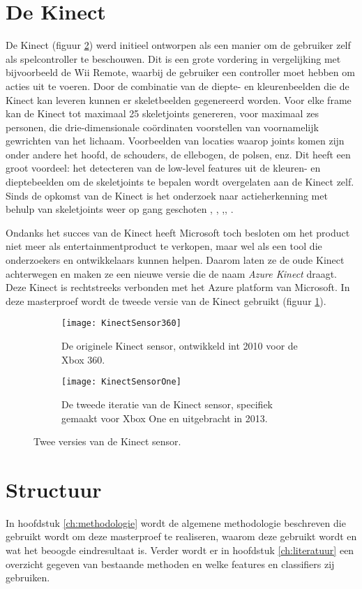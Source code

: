 \section{De Kinect}
De Kinect (figuur \ref{fig:KinectSensorVersies}) werd initieel ontworpen als een manier om de gebruiker zelf als spelcontroller te beschouwen. Dit is een grote vordering in vergelijking met bijvoorbeeld de Wii Remote, waarbij de gebruiker een controller moet hebben om acties uit te voeren. Door de combinatie van de diepte- en kleurenbeelden die de Kinect kan leveren kunnen er skeletbeelden gegenereerd worden. Voor elke frame kan de Kinect tot maximaal 25 skeletjoints genereren, voor maximaal zes personen, die drie-dimensionale coördinaten voorstellen van voornamelijk gewrichten van het lichaam. Voorbeelden van locaties waarop joints komen zijn onder andere het hoofd, de schouders, de ellebogen, de polsen, enz. Dit heeft een groot voordeel: het detecteren van de low-level features uit de kleuren- en dieptebeelden om de skeletjoints te bepalen wordt overgelaten aan de Kinect zelf. Sinds de opkomst van de Kinect is het onderzoek naar actieherkenning met behulp van skeletjoints weer op gang geschoten \cite{Deboeverie2016}, \cite{Xia2012}, \cite{Wang2014},\cite{Vemulapalli2014}, \cite{Li2018}.


Ondanks het succes van de Kinect heeft Microsoft toch besloten om het product niet meer als entertainmentproduct te verkopen, maar wel als een tool die onderzoekers en ontwikkelaars kunnen helpen. Daarom laten ze de oude Kinect achterwegen en maken ze een nieuwe versie  die de  naam \textit{Azure Kinect} draagt. Deze Kinect is rechtstreeks verbonden met het Azure platform van Microsoft. In deze masterproef wordt de tweede versie van de Kinect gebruikt (figuur \ref{fig:KinectSensorOne}).

\begin{figure}
	\begin{subfigure}[t]{0.48\textwidth}
		\texttt{[image: KinectSensor360]}
		\caption{De originele Kinect sensor, ontwikkeld int 2010 voor de Xbox 360.}
	\end{subfigure}
	\begin{subfigure}[t]{0.48\textwidth}
		\texttt{[image: KinectSensorOne]}
		\caption{De tweede iteratie van de Kinect sensor, specifiek gemaakt voor Xbox One en uitgebracht in 2013.}
		\label{fig:KinectSensorOne}
	\end{subfigure}
	\caption{Twee versies van de Kinect sensor.}
	\label{fig:KinectSensorVersies}
\end{figure}




\section{Structuur}
In hoofdstuk \ref{ch:methodologie} wordt de algemene methodologie beschreven die gebruikt wordt om deze masterproef te realiseren, waarom deze gebruikt wordt en wat het beoogde eindresultaat is. Verder wordt er in hoofdstuk \ref{ch:literatuur} een overzicht gegeven van bestaande methoden en welke features en classifiers zij gebruiken.
